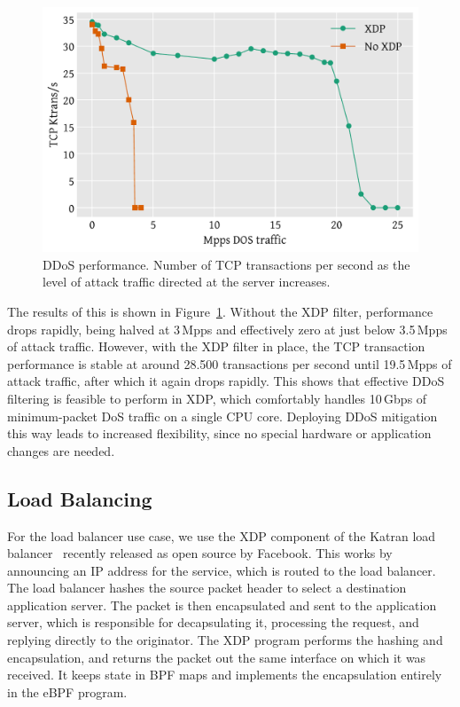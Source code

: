 \documentclass[sigconf]{acmart}
\begin{document}
\begin{figure}[t]
\centering
\includegraphics[width=\linewidth]{figures/ddos-test.pdf}
\caption{\label{fig:ddos-results} DDoS performance. Number of TCP transactions
  per second as the level of attack traffic directed at the server increases.}
\end{figure}

The results of this is shown in Figure~\ref{fig:ddos-results}. Without the XDP
filter, performance drops rapidly, being halved at 3\,Mpps and effectively zero
at just below 3.5\,Mpps of attack traffic. However, with the XDP filter in
place, the TCP transaction performance is stable at around 28.500 transactions
per second until 19.5\,Mpps of attack traffic, after which it again drops
rapidly. This shows that effective DDoS filtering is feasible to perform in XDP,
which comfortably handles 10\,Gbps of minimum-packet DoS traffic on a single CPU
core. Deploying DDoS mitigation this way leads to increased flexibility, since
no special hardware or application changes are needed.

\subsection{Load Balancing}
\label{sec:load-balancer}
For the load balancer use case, we use the XDP component of the Katran load
balancer~\cite{katran} recently released as open source by Facebook. This works
by announcing an IP address for the service, which is routed to the load
balancer. The load balancer hashes the source packet header to select a
destination application server. The packet is then encapsulated and sent to the
application server, which is responsible for decapsulating it, processing the
request, and replying directly to the originator. The XDP program performs the
hashing and encapsulation, and returns the packet out the same interface on
which it was received. It keeps state in BPF maps and implements the
encapsulation entirely in the eBPF program.
\end{document}
